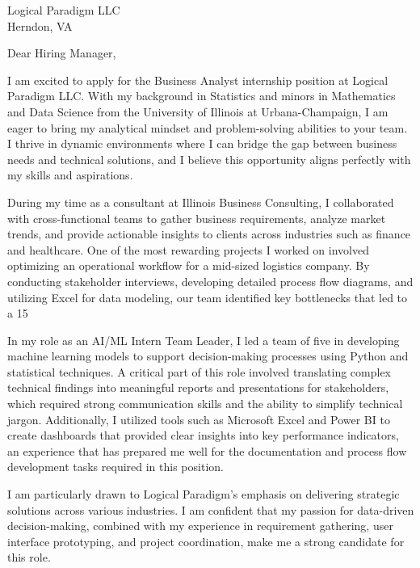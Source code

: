 \documentclass{letter}
\begin{document}
\begin{letter}{Logical Paradigm LLC\\
    Herndon, VA
    }


\opening{Dear Hiring Manager,}

I am excited to apply for the Business Analyst internship position at Logical Paradigm LLC. With my background in Statistics and minors in Mathematics and Data Science from the University of Illinois at Urbana-Champaign, I am eager to bring my analytical mindset and problem-solving abilities to your team. I thrive in dynamic environments where I can bridge the gap between business needs and technical solutions, and I believe this opportunity aligns perfectly with my skills and aspirations.

During my time as a consultant at Illinois Business Consulting, I collaborated with cross-functional teams to gather business requirements, analyze market trends, and provide actionable insights to clients across industries such as finance and healthcare. One of the most rewarding projects I worked on involved optimizing an operational workflow for a mid-sized logistics company. By conducting stakeholder interviews, developing detailed process flow diagrams, and utilizing Excel for data modeling, our team identified key bottlenecks that led to a 15%

In my role as an AI/ML Intern Team Leader, I led a team of five in developing machine learning models to support decision-making processes using Python and statistical techniques. A critical part of this role involved translating complex technical findings into meaningful reports and presentations for stakeholders, which required strong communication skills and the ability to simplify technical jargon. Additionally, I utilized tools such as Microsoft Excel and Power BI to create dashboards that provided clear insights into key performance indicators, an experience that has prepared me well for the documentation and process flow development tasks required in this position.

I am particularly drawn to Logical Paradigm's emphasis on delivering strategic solutions across various industries. I am confident that my passion for data-driven decision-making, combined with my experience in requirement gathering, user interface prototyping, and project coordination, make me a strong candidate for this role.


\end{letter}
\end{document}
